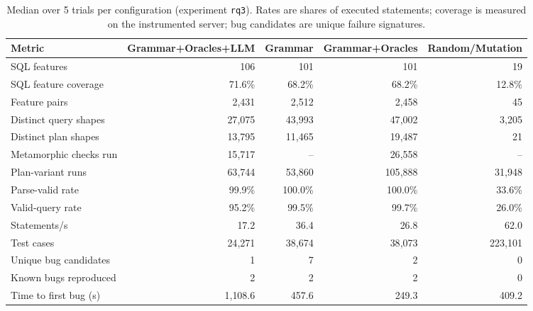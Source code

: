 \begin{table}[t]
  \caption{Median over 5 trials per configuration (experiment \texttt{rq3}). Rates are shares of executed statements; coverage is measured on the instrumented server; bug candidates are unique failure signatures.}
  \label{tab:rq3-summary}
  \footnotesize
  \begin{tabular}{lrrrr}
    \toprule
    Metric & Grammar+Oracles+LLM & Grammar & Grammar+Oracles & Random/Mutation \\
    \midrule
    SQL features & 106 & 101 & 101 & 19 \\
    SQL feature coverage & 71.6\% & 68.2\% & 68.2\% & 12.8\% \\
    Feature pairs & 2{,}431 & 2{,}512 & 2{,}458 & 45 \\
    Distinct query shapes & 27{,}075 & 43{,}993 & 47{,}002 & 3{,}205 \\
    Distinct plan shapes & 13{,}795 & 11{,}465 & 19{,}487 & 21 \\
    Metamorphic checks run & 15{,}717 & -- & 26{,}558 & -- \\
    Plan-variant runs & 63{,}744 & 53{,}860 & 105{,}888 & 31{,}948 \\
    Parse-valid rate & 99.9\% & 100.0\% & 100.0\% & 33.6\% \\
    Valid-query rate & 95.2\% & 99.5\% & 99.7\% & 26.0\% \\
    Statements/s & 17.2 & 36.4 & 26.8 & 62.0 \\
    Test cases & 24{,}271 & 38{,}674 & 38{,}073 & 223{,}101 \\
    Unique bug candidates & 1 & 7 & 2 & 0 \\
    Known bugs reproduced & 2 & 2 & 2 & 0 \\
    Time to first bug (s) & 1{,}108.6 & 457.6 & 249.3 & 409.2 \\
    \bottomrule
  \end{tabular}
\end{table}
